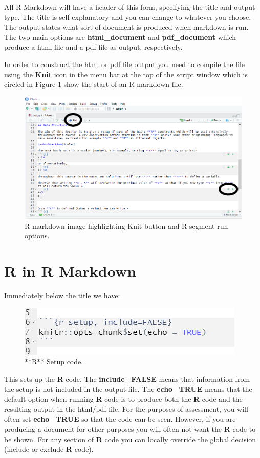 \documentclass[
]{book}
\begin{document}
All R Markdown will have a header of this form, specifying the title and output type. The title is self-explanatory and you can change to whatever you choose. The output states what sort of document is produced when markdown is run. The two main options are \textbf{html\_document} and \textbf{pdf\_document} which produce a html file and a pdf file as output, respectively.

In order to construct the html or pdf file output you need to compile the file using the \textbf{Knit} icon in the menu bar at the top of the script window which is circled in Figure \ref{fig:Rmark2} show the start of an R markdown file.

\begin{figure}
\includegraphics[width=0.8\linewidth]{Images/Rmarkdown_1c} \caption{R markdown image highlighting Knit button and R segment run options.}\label{fig:Rmark2}
\end{figure}

\hypertarget{Rmark_R}{%
\section{R in R Markdown}\label{Rmark_R}}

Immediately below the title we have:

\begin{figure}
\includegraphics[width=0.8\linewidth]{Images/Rmarkdown_5} \caption{**R** Setup code.}\label{fig:Rmark5}
\end{figure}

This sets up the \textbf{R} code. The \textbf{include=FALSE} means that information from the setup is not included in the output file. The \textbf{echo=TRUE} means that the default option when running \textbf{R} code is to produce both the \textbf{R} code and the resulting output in the html/pdf file. For the purposes of assessment, you will often set \textbf{echo=TRUE} so that the code can be seen. However, if you are producing a document for other purposes you will often not want the \textbf{R} code to be shown. For any section of \textbf{R} code you can locally override the global decision (include or exclude \textbf{R} code).
\end{document}
